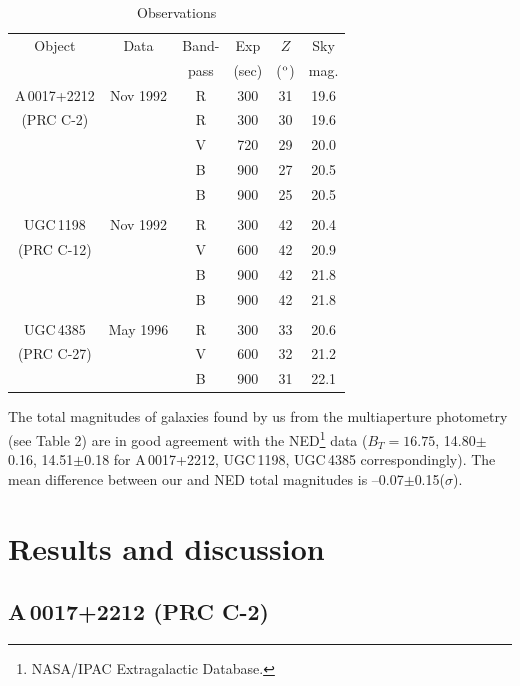 \documentclass[]{aa}
\begin{document}
\begin{table}
\caption{ Observations }
\begin{center}
\begin{tabular}{|c|c|c|c|c|c|}
\hline
Object &  Data & Band-  & Exp &  $Z$    & Sky  \\
       &       & pass   & (sec)& ($^{\rm o}$)& mag. \\
\hline                   
A\,0017+2212     & Nov 1992 & R   & 300 & 31 & 19.6\\
 (PRC C-2)     &           & R   & 300 & 30 &19.6 \\
	       &           & V   & 720 & 29 & 20.0\\
	       &           & B   & 900 & 27 & 20.5\\
	       &           & B   & 900 & 25 & 20.5\\
               &           &     &     &       & \\
UGC\,1198      & Nov 1992 & R  & 300 & 42 & 20.4 \\
 (PRC C-12)     &           & V  & 600 & 42 & 20.9 \\
		&           & B  & 900 & 42 & 21.8 \\
		&           & B  & 900 & 42 & 21.8\\
		&           &    &     &       & \\
UGC\,4385       & May 1996&  R  & 300 & 33 & 20.6 \\	       
 (PRC C-27)     &          &  V  & 600 & 32 & 21.2 \\ 
                &          &  B  & 900 & 31 & 22.1 \\
\hline
\end{tabular}
\end{center}
\end{table}

The total magnitudes of galaxies found by us from the multiaperture
photometry (see Table 2) are in good agreement with the 
NED\footnote{NASA/IPAC Extragalactic Database.} data
($B_T=16.75$, 14.80$\pm$0.16, 14.51$\pm$0.18 for A\,0017+2212, UGC\,1198,
UGC\,4385 correspondingly). The mean difference between our and
NED total magnitudes is --0.07$\pm$0.15($\sigma$).

\section{Results and discussion}

\subsection{A\,0017+2212 (PRC C-2)}
\end{document}
